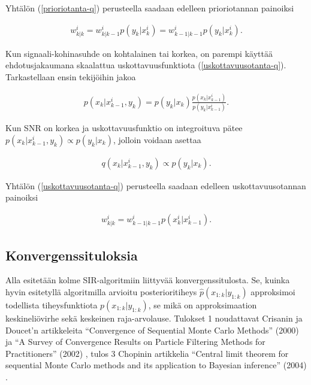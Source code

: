 \documentclass[
  12pt,
  a4paper, twoside]{book}
\begin{document}
\noindent Yhtälön (\ref{prioriotanta-q}) perusteella saadaan edelleen prioriotannan painoiksi

\begin{align}\label{prioriotanta-w}
w^i_{k|k} = w^i_{k|k-1}p(y_k|x^i_k) = w^i_{k-1|k-1}p(y_k|x^i_k).
\end{align}

Kun signaali-kohinasuhde on kohtalainen tai korkea, on parempi käyttää ehdotusjakaumana skaalattua uskottavuusfunktiota (\ref{uskottavuusotanta-q}). Tarkastellaan ensin tekijöihin jakoa

\begin{align}\label{uskottavuusotanta-factorization}
p(x_k|x^i_{k-1},y_k)=p(y_k|x_k)\frac{p(x_k|x^i_{k-1})}{p(y_k|x^i_{k-1})}.
\end{align}

\noindent Kun SNR on korkea ja uskottavuusfunktio on integroituva pätee \(p(x_k|x^i_{k-1},y_{k}) \propto p(y_k|x_k)\), jolloin voidaan asettaa

\begin{align}\label{uskottavuusotanta-q}
q(x_k|x^i_{k-1},y_{k}) \propto p(y_k|x_k).
\end{align}

\noindent Yhtälön (\ref{uskottavuusotanta-q}) perusteella saadaan edelleen uskottavuusotannan painoiksi

\begin{align}\label{uskottavuusotanta-w}
w^i_{k|k} = w^i_{k-1|k-1}p(x^i_k|x^i_{k-1}).
\end{align}

\subsection{Konvergenssituloksia}

Alla esitetään kolme SIR-algoritmiin liittyvää konvergenssitulosta. Se, kuinka hyvin esitetyllä algoritmilla arvioitu posterioritiheys \(\hat{p}(x_{1:k}|y_{1:k})\) approksimoi todellista tiheysfunktiota \(p(x_{1:k}|y_{1:k})\), se mikä on approksimaation keskineliövirhe sekä keskeinen raja-arvolause. Tulokset 1 noudattavat Crisanin ja Doucet'n artikkeleita ``Convergence of Sequential Monte Carlo Methods'' (2000) \citep{crisan-2000} ja ``A Survey of Convergence Results on Particle Filtering Methods for Practitioners'' (2002) \citep{crisan-2002}, tulos 3 Chopinin artikkelia ``Central limit theorem for sequential Monte Carlo methods and its application to Bayesian inference'' (2004) \citep{chopin-2004}.
\end{document}
